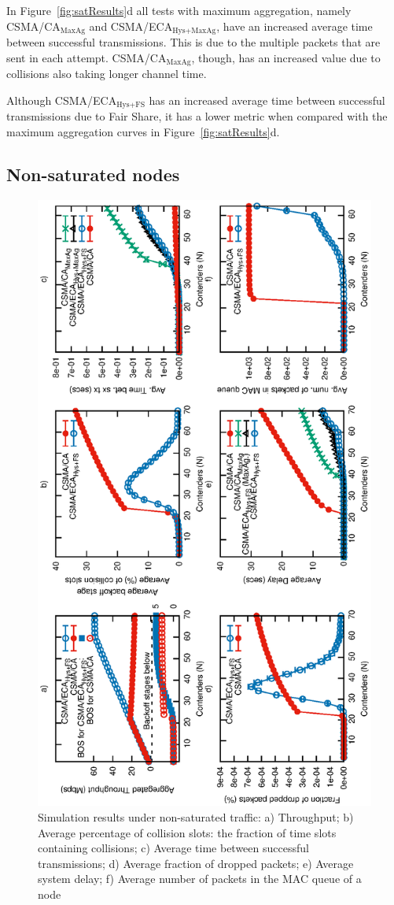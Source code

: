 	In Figure~\ref{fig:satResults}d all tests with maximum aggregation, namely CSMA/CA$_{\text{MaxAg}}$ and CSMA/ECA$_{\text{Hys+MaxAg}}$, have an increased average time between successful transmissions. This is due to the multiple packets that are sent in each attempt. CSMA/CA$_{\text{MaxAg}}$, though, has an increased value due to collisions also taking longer channel time.
	
	Although CSMA/ECA$_{\text{Hys+FS}}$ has an increased average time between successful transmissions due to Fair Share, it has a lower metric when compared with the maximum aggregation curves in Figure~\ref{fig:satResults}d.




	\subsection{Non-saturated nodes}\label{resultsUnsaturated}
	
	\begin{figure}[tb]
		\centering
		\includegraphics[width=0.5\linewidth,angle=-90]{figures/tonFigs/nonsaturation-combined.eps}
		\caption{Simulation results under non-saturated traffic: a) Throughput; b) Average percentage of collision slots: the fraction of time slots containing collisions; c) Average time between successful transmissions; d) Average fraction of dropped packets; e) Average system delay; f) Average number of packets in the MAC queue of a node}
		\label{fig:unsatResults}
	\end{figure}
	
